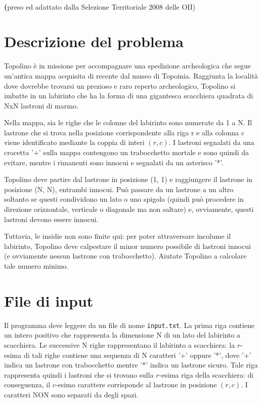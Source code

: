 \documentclass[a4paper,11pt]{article}
\newcommand{\file}[1]{\texttt{#1}}
\newcommand{\nome}{Mappa antica}
\newcommand{\nomebreve}{mappa}
\begin{document}
\noindent{\Huge \textbf \nome~(\texttt{\nomebreve})}\\
{\large \textbf (preso ed adattato dalla Selezione Territoriale 2008 delle OII)}


\section*{Descrizione del problema}
Topolino è in missione per accompagnare una spedizione archeologica che segue un'antica mappa
acquisita di recente dal museo di Topoinia. Raggiunta la località dove dovrebbe trovarsi un
prezioso e raro reperto archeologico, Topolino si imbatte in un labirinto che ha la forma di una
gigantesca scacchiera quadrata di NxN lastroni di marmo.

Nella mappa, sia le righe che le colonne del labirinto sono numerate da 1 a N. Il lastrone che si
trova nella posizione corrispondente alla riga r e alla colonna c viene identificato mediante la
coppia di interi $(r, c)$. I lastroni segnalati da una crocetta '+' sulla mappa contengono un
trabocchetto mortale e sono quindi da evitare, mentre i rimanenti sono innocui e segnalati da un
asterisco '*'.

Topolino deve partire dal lastrone in posizione (1, 1) e raggiungere il lastrone in posizione (N, N),
entrambi innocui. Può passare da un lastrone a un altro soltanto se questi condividono un lato o
uno spigolo (quindi può procedere in direzione orizzontale, verticale o diagonale ma non saltare) e,
ovviamente, questi lastroni devono essere innocui.

Tuttavia, le insidie non sono finite qui: per poter attraversare incolume il labirinto, Topolino deve
calpestare il minor numero possibile di lastroni innocui (e ovviamente nessun lastrone con
trabocchetto). Aiutate Topolino a calcolare tale numero minimo.

\section*{File di input}
Il programma deve leggere da un file di nome \file{input.txt}. La prima riga contiene un intero positivo che rappresenta la dimensione N di un lato del labirinto a scacchiera. 
Le successive N righe rappresentano il labirinto a scacchiera: la $r$-esima di tali righe contiene una
sequenza di N caratteri '+' oppure '*', dove '+' indica un lastrone con trabocchetto mentre '*' indica
un lastrone sicuro. Tale riga rappresenta quindi i lastroni che si trovano sulla $r$-esima riga della
scacchiera: di conseguenza, il $c$-esimo carattere corrisponde al lastrone in posizione $(r, c)$. I caratteri NON sono separati da degli spazi.
\end{document}
